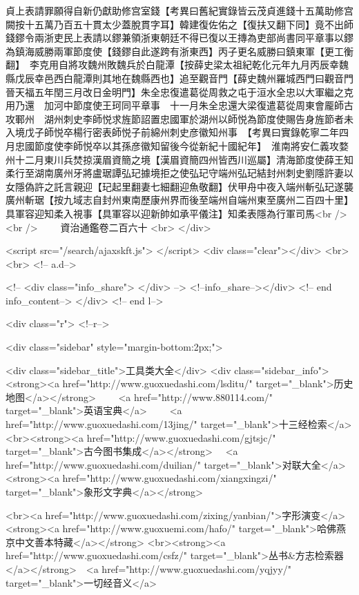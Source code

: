 貞上表請罪願得自新仍獻助修宫室錢【考異曰舊紀實錄皆云茂貞進錢十五萬助修宫闕按十五萬乃百五十貫太少蓋脫貫字耳】韓建復佐佑之【復扶又翻下同】竟不出師　錢鏐令兩浙吏民上表請以鏐兼領浙東朝廷不得已復以王摶為吏部尚書同平章事以鏐為鎮海威勝兩軍節度使【錢鏐自此遂跨有浙東西】丙子更名威勝曰鎮東軍【更工衡翻】　李克用自將攻魏州敗魏兵於白龍潭【按薛史梁太祖紀乾化元年九月丙辰幸魏縣戊辰幸邑西白龍潭則其地在魏縣西也】追至觀音門【薛史魏州羅城西門曰觀音門晉天福五年閏三月改日金明門】朱全忠復遣葛從周救之屯于洹水全忠以大軍繼之克用乃還　加河中節度使王珂同平章事　十一月朱全忠還大梁復遣葛從周東會龎師古攻鄆州　湖州刺史李師悦求旌節詔置忠國軍於湖州以師悦為節度使賜告身旌節者未入境戊子師悦卒楊行密表師悦子前綿州刺史彦徽知州事　【考異曰實錄乾寧二年四月忠國節度使李師悦卒以其孫彦徽知留後今從新紀十國紀年】　淮南將安仁義攻婺州十二月東川兵焚掠漢眉資簡之境【漢眉資簡四州皆西川巡屬】清海節度使薛王知柔行至湖南廣州牙將盧琚譚弘玘據境拒之使弘玘守端州弘玘結封州刺史劉隱許妻以女隱偽許之託言親迎【玘起里翻妻七細翻迎魚敬翻】伏甲舟中夜入端州斬弘玘遂襲廣州斬琚【按九域志自封州東南歷康州界而後至端州自端州東至廣州二百四十里】具軍容迎知柔入視事【具軍容以迎新帥如承平儀注】知柔表隱為行軍司馬<br />
<br />
　　資治通鑑卷二百六十  <br>
   </div> 

<script src="/search/ajaxskft.js"> </script>
 <div class="clear"></div>
<br>
<br>
 <!-- a.d-->

 <!--
<div class="info_share">
</div> 
-->
 <!--info_share--></div>   <!-- end info_content-->
  </div> <!-- end l-->

<div class="r">   <!--r-->



<div class="sidebar"  style="margin-bottom:2px;">

 
<div class="sidebar_title">工具类大全</div>
<div class="sidebar_info">
<strong><a href="http://www.guoxuedashi.com/lsditu/" target="_blank">历史地图</a></strong>　　
<a href="http://www.880114.com/" target="_blank">英语宝典</a>　　
<a href="http://www.guoxuedashi.com/13jing/" target="_blank">十三经检索</a>　
<br><strong><a href="http://www.guoxuedashi.com/gjtsjc/" target="_blank">古今图书集成</a></strong>　
<a href="http://www.guoxuedashi.com/duilian/" target="_blank">对联大全</a>　<strong><a href="http://www.guoxuedashi.com/xiangxingzi/" target="_blank">象形文字典</a></strong>　

<br><a href="http://www.guoxuedashi.com/zixing/yanbian/">字形演变</a>　　<strong><a href="http://www.guoxuemi.com/hafo/" target="_blank">哈佛燕京中文善本特藏</a></strong>
<br><strong><a href="http://www.guoxuedashi.com/csfz/" target="_blank">丛书&方志检索器</a></strong>　<a href="http://www.guoxuedashi.com/yqjyy/" target="_blank">一切经音义</a>　　

